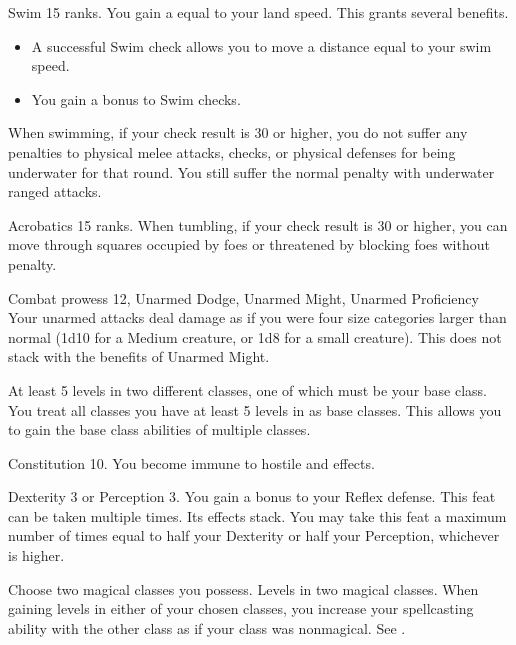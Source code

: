 \featpre Swim 15 ranks.
\featben You gain a  equal to your land speed.
This grants several benefits.
\begin{itemize}
    \item A successful Swim check allows you to move a distance equal to your swim speed.
    \item You gain a  bonus to Swim checks.
\end{itemize}

When swimming, if your check result is 30 or higher, you do not suffer any penalties to physical melee attacks, checks, or physical defenses for being underwater for that round.
You still suffer the normal penalty with underwater ranged attacks.

\featpre Acrobatics 15 ranks.
\featben When tumbling, if your check result is 30 or higher, you can move through squares occupied by foes or threatened by blocking foes without penalty.

\featpre Combat prowess 12, Unarmed Dodge, Unarmed Might, Unarmed Proficiency
\featben Your unarmed attacks deal damage as if you were four size categories larger than normal (1d10 for a Medium creature, or 1d8 for a small creature).
This does not stack with the benefits of Unarmed Might.

\featpre At least 5 levels in two different classes, one of which must be your base class.
\featben You treat all classes you have at least 5 levels in as base classes.
This allows you to gain the base class abilities of multiple classes.

\featpre Constitution 10.
\featben You become immune to hostile  and  effects.

\featpre Dexterity 3 or Perception 3.
\featben You gain a  bonus to your Reflex defense.
 This feat can be taken multiple times. Its effects stack.
You may take this feat a maximum number of times equal to half your Dexterity or half your Perception, whichever is higher.

Choose two magical classes you possess.
\featpres
Levels in two magical classes.
\featben When gaining levels in either of your chosen classes, you increase your spellcasting ability with the other class as if your class was nonmagical.
See .

